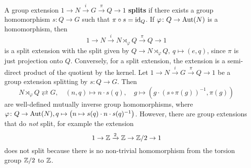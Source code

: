 \begin{remark}
    A group extension $1 \to N \xrightarrow iG \xrightarrow{\pi} Q \to 1$ \textbf{splits} if there exists a group homomorphism $s \colon Q \to G$ such that $\pi \circ s = \operatorname{id}_Q$. If $\varphi  \colon Q \to \mathrm{Aut}(N)$ is a homomorphism, then \[
    1 \to N \xrightarrow iN \rtimes _{\varphi }Q \xrightarrow{\pi} Q \to 1
\] is a split extension with the split given by $Q \to N \rtimes _{\varphi }Q, \ q \mapsto (e,q)$, since $\pi$ is just projection onto $Q$. Conversely, for a split extension, the extension is a semi-direct product of the quotient by the kernel. Let $1 \to  N \xrightarrow iG \xrightarrow{\pi} Q \to 1$ be a group extension splitting by $s \colon Q \to G$. Then \[
N \rtimes _{\varphi }Q \rightleftarrows G,\quad (n,q) \mapsto  n \cdot s(q), \quad g \mapsto  (g \cdot (s \circ \pi(g))^{-1},\pi(g)) 
\] are well-defined mutually inverse group homomorphisms, where $\varphi  \colon Q \to \mathrm{Aut}(N), q \mapsto \left(n \mapsto  s(q) \cdot n \cdot s(q) ^{-1}\right)$. However, there are group extensions that do \emph{not} split, for example the extension \[
1 \to \mathbb{Z} \xrightarrow 2\mathbb{Z} \to \mathbb{Z} /2 \to 1
\] does not split because there is no non-trivial homomorphism from the torsion group $\mathbb{Z} /2$ to $\mathbb{Z}$.
\end{remark}
